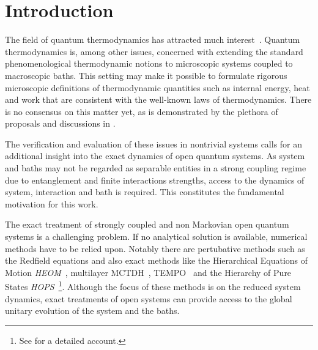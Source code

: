 \chapter{Introduction}
\label{chap:intro}
The field of quantum thermodynamics has attracted much
interest~\cite{Talkner2020Oct,Rivas2019Oct,Riechers2021Apr,Vinjanampathy2016Oct,Binder2018,Kurizki2021Dec}. Quantum
thermodynamics is, among other issues, concerned with extending the
standard phenomenological thermodynamic notions to microscopic systems
coupled to macroscopic baths. This setting may make it possible to
formulate rigorous microscopic definitions of thermodynamic quantities
such as internal energy, heat and work that are consistent with the
well-known laws of thermodynamics. There is no consensus on this
matter yet, as is demonstrated by the plethora of proposals and
discussions in
\cite{Rivas2019Oct,Talkner2020Oct,Motz2018Nov,Wiedmann2020Mar,Senior2020Feb,Kato2015Aug,Kato2016Dec,Strasberg2021Aug,Talkner2016Aug,Bera2021Feb,Bera2021Jun,Esposito2015Dec}.

The verification and evaluation of these issues in nontrivial
systems calls for an additional insight into the exact dynamics of
open quantum systems.  As system and baths may not be regarded as
separable entities in a strong coupling
regime~\cite{Rivas2019Oct,Esposito2015Dec} due to entanglement and
finite interactions strengths, access to the dynamics of system,
interaction and bath is required. This constitutes the fundamental
motivation for this work.

The exact treatment of strongly coupled and non Markovian open quantum
systems is a challenging problem.  If no analytical solution is
available, numerical methods have to be relied upon. Notably there are
pertubative methods such as the Redfield equations
\cite{Davidovic2020Sep} and also exact methods like the Hierarchical
Equations of Motion \emph{HEOM}~\cite{Tanimura1990Jun,Tang2015Dec},
multilayer MCTDH~\cite{Wang2010May}, TEMPO~\cite{Strathearn2018Aug}
and the Hierarchy of Pure States
\emph{HOPS}~\cite{Suess2014Oct}\footnote{See \cite{RichardDiss} for a
  detailed account.}. Although the focus of these methods is on the
reduced system dynamics, exact treatments of open systems can provide
access to the global unitary evolution of the system and the baths.



